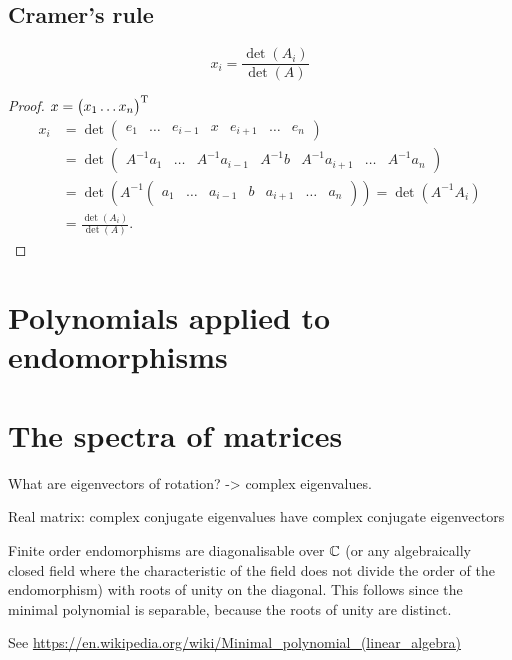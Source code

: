 \subsection{Cramer's rule}
\begin{proposition}
\[ x_i = \frac{\det(A_i)}{\det(A)} \]
\end{proposition}
\begin{proof}
$x = \begin{pmatrix}
x_1 \hdots x_n
\end{pmatrix}^{\mathrm{T}}$
\begin{align*}
x_i &= \det \begin{pmatrix}
e_1 & \hdots & e_{i-1} & x & e_{i+1} & \hdots & e_n
\end{pmatrix} \\
&= \det \begin{pmatrix}
A^{-1}a_1 & \hdots & A^{-1}a_{i-1} & A^{-1}b & A^{-1}a_{i+1} & \hdots & A^{-1}a_n
\end{pmatrix} \\
&= \det (A^{-1}\begin{pmatrix}
a_1 & \hdots & a_{i-1} & b & a_{i+1} & \hdots & a_n
\end{pmatrix}) = \det(A^{-1}A_i) \\
&= \frac{\det(A_i)}{\det(A)}.
\end{align*}
\end{proof}


\section{Polynomials applied to endomorphisms}
\section{The spectra of matrices}
What are eigenvectors of rotation? -> complex eigenvalues.

Real matrix: complex conjugate eigenvalues have complex conjugate eigenvectors

Finite order endomorphisms are diagonalisable over $\mathbb{C}$ (or any algebraically closed field where the characteristic of the field does not divide the order of the endomorphism) with roots of unity on the diagonal. This follows since the minimal polynomial is separable, because the roots of unity are distinct.

See \url{https://en.wikipedia.org/wiki/Minimal_polynomial_(linear_algebra)}